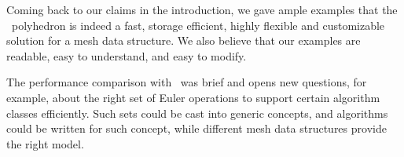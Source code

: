 Coming back to our claims in the introduction, we gave ample examples 
that the \cgal\ polyhedron is indeed a fast, storage efficient,
highly flexible and customizable solution for a mesh data
structure. We also believe that our examples are readable, easy to
understand, and easy to modify. 

The performance comparison with \openmesh\ was brief and opens new
questions, for example, about the right set of Euler operations to
support certain algorithm classes efficiently. Such sets could be cast
into generic concepts, and algorithms could be written for such
concept, while different mesh data structures provide the right model.
